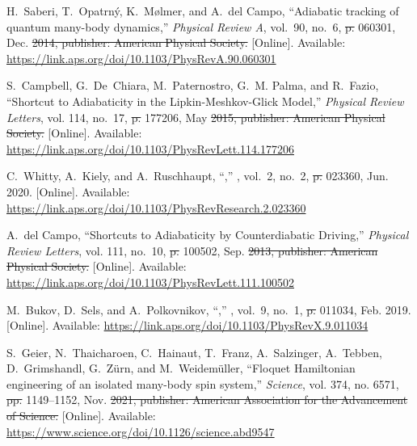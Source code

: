 \documentclass[a4paper,oneside,11pt]{book}
\providecommand{\DIFaddtex}[1]{{\protect\color{blue}\uwave{#1}}} %
\providecommand{\DIFdeltex}[1]{{\protect\color{red}\sout{#1}}}                      %
\providecommand{\DIFaddbegin}{} %
\providecommand{\DIFaddend}{} %
\providecommand{\DIFdelbegin}{} %
\providecommand{\DIFdelend}{} %
\providecommand{\DIFadd}[1]{\texorpdfstring{\DIFaddtex{#1}}{#1}} %
\providecommand{\DIFdel}[1]{\texorpdfstring{\DIFdeltex{#1}}{}} %
\newcommand{\DIFscaledelfig}{0.5}
\newlength{\DIFdelgraphicswidth} %
\newlength{\DIFdelgraphicsheight} %
\newcommand{\DIFaddincludegraphics}[2][]{{\color{blue}\fbox{\DIFOincludegraphics[#1]{#2}}}} %
\newcommand{\DIFdelincludegraphics}[2][]{%
\sbox{\DIFdelgraphicsbox}{\DIFOincludegraphics[#1]{#2}}%
\settoboxwidth{\DIFdelgraphicswidth}{\DIFdelgraphicsbox} %
\settoboxtotalheight{\DIFdelgraphicsheight}{\DIFdelgraphicsbox} %
\scalebox{\DIFscaledelfig}{%
\parbox[b]{\DIFdelgraphicswidth}{\usebox{\DIFdelgraphicsbox}\\[-\baselineskip] \rule{\DIFdelgraphicswidth}{0em}}\llap{\resizebox{\DIFdelgraphicswidth}{\DIFdelgraphicsheight}{%
\setlength{\unitlength}{\DIFdelgraphicswidth}%
\begin{picture}(1,1)%
\thicklines\linethickness{2pt} %
{\color[rgb]{1,0,0}\put(0,0){\framebox(1,1){}}}%
{\color[rgb]{1,0,0}\put(0,0){\line( 1,1){1}}}%
{\color[rgb]{1,0,0}\put(0,1){\line(1,-1){1}}}%
\end{picture}%
}\hspace*{3pt}}} %
} %
\DeclareRobustCommand{\DIFaddbegin}{\DIFOaddbegin \let\includegraphics\DIFaddincludegraphics} %
\DeclareRobustCommand{\DIFaddend}{\DIFOaddend \let\includegraphics\DIFOincludegraphics} %
\DeclareRobustCommand{\DIFdelbegin}{\DIFOdelbegin \let\includegraphics\DIFdelincludegraphics} %
\DeclareRobustCommand{\DIFdelend}{\DIFOaddend \let\includegraphics\DIFOincludegraphics} %
\begin{document}
\begin{thebibliography}{100}
\BIBentryALTinterwordspacing
H.~Saberi, T.~Opatrný, K.~Mølmer, and A.~del Campo, ``Adiabatic tracking of
  quantum many-body dynamics,'' \emph{Physical Review A}, vol.~90, no.~6,
  \DIFdelbegin \DIFdel{p.
  }\DIFdelend 060301, Dec. \DIFdelbegin \DIFdel{2014, publisher: American Physical Society. }\DIFdelend \DIFaddbegin \DIFadd{2014. }\DIFaddend [Online]. Available:
  \url{https://link.aps.org/doi/10.1103/PhysRevA.90.060301}
\BIBentrySTDinterwordspacing

\BIBentryALTinterwordspacing
S.~Campbell, G.~De~Chiara, M.~Paternostro, G.~M. Palma, and R.~Fazio,
  ``Shortcut to {Adiabaticity} in the {Lipkin}-{Meshkov}-{Glick} {Model},''
  \emph{Physical Review Letters}, vol. 114, no.~17,  \DIFdelbegin \DIFdel{p. }\DIFdelend 177206, May \DIFdelbegin \DIFdel{2015,
  publisher: American Physical Society. }\DIFdelend \DIFaddbegin \DIFadd{2015.
  }\DIFaddend [Online]. Available:
  \url{https://link.aps.org/doi/10.1103/PhysRevLett.114.177206}
\BIBentrySTDinterwordspacing

\BIBentryALTinterwordspacing
C.~Whitty, A.~Kiely, and A.~Ruschhaupt, ``,''
  \emph{}, vol.~2, no.~2,
  \DIFdelbegin \DIFdel{p.
  }\DIFdelend 023360, Jun. 2020. [Online]. Available:
  \url{https://link.aps.org/doi/10.1103/PhysRevResearch.2.023360}
\BIBentrySTDinterwordspacing

\BIBentryALTinterwordspacing
A.~del Campo, ``Shortcuts to {Adiabaticity} by {Counterdiabatic} {Driving},''
  \emph{Physical Review Letters}, vol. 111, no.~10,  \DIFdelbegin \DIFdel{p. }\DIFdelend 100502, Sep. \DIFdelbegin \DIFdel{2013,
  publisher: American Physical Society. }\DIFdelend \DIFaddbegin \DIFadd{2013.
  }\DIFaddend [Online]. Available:
  \url{https://link.aps.org/doi/10.1103/PhysRevLett.111.100502}
\BIBentrySTDinterwordspacing

\BIBentryALTinterwordspacing
M.~Bukov, D.~Sels, and A.~Polkovnikov, ``,''
  \emph{}, vol.~9, no.~1,  \DIFdelbegin \DIFdel{p. }\DIFdelend 011034,
  Feb. 2019. [Online]. Available:
  \url{https://link.aps.org/doi/10.1103/PhysRevX.9.011034}
\BIBentrySTDinterwordspacing

\BIBentryALTinterwordspacing
S.~Geier, N.~Thaicharoen, C.~Hainaut, T.~Franz, A.~Salzinger, A.~Tebben,
  D.~Grimshandl, G.~Zürn, and M.~Weidemüller, ``Floquet {Hamiltonian}
  engineering of an isolated many-body spin system,'' \emph{Science}, vol. 374,
  no. 6571,  \DIFdelbegin \DIFdel{pp. }\DIFdelend 1149--1152, Nov. \DIFdelbegin \DIFdel{2021, publisher: American Association for the
  Advancement of Science. }\DIFdelend \DIFaddbegin \DIFadd{2021. }\DIFaddend [Online]. Available:
  \url{https://www.science.org/doi/10.1126/science.abd9547}
\BIBentrySTDinterwordspacing


\end{thebibliography}
\end{document}
